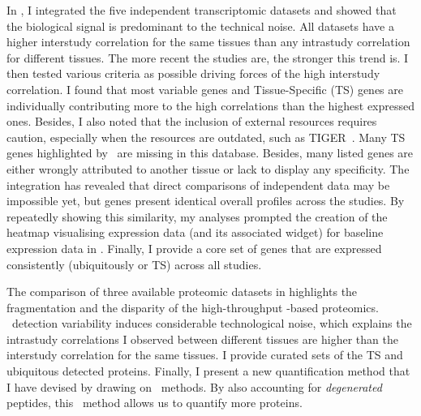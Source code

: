 In ,
I integrated the five independent transcriptomic datasets and
showed that the biological signal is predominant to the technical noise.
All datasets have a higher interstudy correlation for the same tissues
than any intrastudy correlation for different tissues.
The more recent the studies are, the stronger this trend is.
I then tested various criteria as possible driving forces
of the high interstudy correlation.
I found that most variable genes and Tissue-Specific (\gls{TS}) genes
are individually contributing more to the high correlations
than the highest expressed ones.
Besides, I also noted that
the inclusion of external resources requires caution,
especially when the resources are outdated, such as \gls{TIGER}~.
Many \gls{TS} genes highlighted by \Rnaseq\ are missing in this database.
Besides, many listed genes are either wrongly attributed to another tissue
or lack to display any specificity.
The integration has revealed that
direct comparisons of independent data may be impossible yet,
but genes present identical overall profiles across the studies.
By repeatedly showing this similarity, my analyses prompted
the creation of the heatmap visualising expression data
(and its associated widget) for baseline expression data in
.
Finally, I provide a core set of genes that are expressed consistently
(ubiquitously or \gls{TS}) across all studies.\mybr\

The comparison of three available proteomic datasets
in  highlights
the fragmentation and the disparity of the high-throughput \ms{}-based proteomics.
\ms\ detection variability induces considerable technological noise,
which explains
the intrastudy correlations I observed between different tissues are
higher than the interstudy correlation for the same tissues.
I provide curated sets of the \gls{TS} and ubiquitous detected proteins.
Finally, I present a new quantification method that
I have devised by drawing on \Rnaseq\ methods.
By also accounting for \emph{degenerated} peptides,
this \PPKM\ method allows us to quantify more proteins.\mybr\

